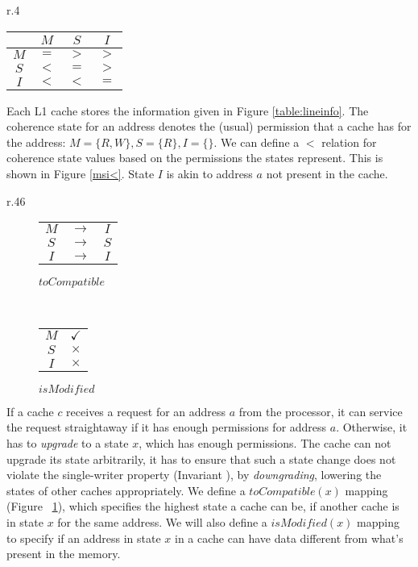 \begin{wrapfigure}{r}{.4\linewidth}
\centering
\begin{tabular}{|c|ccc|}
\hline
& $M$ & $S$ & $I$\\
\hline
$M$ & $=$ & $>$ & $>$\\
$S$ & $<$ & $=$ & $>$\\
$I$ & $<$ & $<$ & $=$\\
\hline
\end{tabular}
\caption{$<$ and other relations for MSI states}
\label{msi<}
\end{wrapfigure}

Each L1 cache stores the information given in Figure \ref{table:lineinfo}. The
coherence state for an address denotes the (usual) permission that a cache has
for the address: $M = \{R, W\}, S = \{R\}, I = \{\}$. We can define a $<$
relation for coherence state values based on the permissions the states
represent. This is shown in Figure \ref{msi<}. State $I$ is akin to address $a$
not present in the cache.

\begin{wrapfigure}{r}{.46\linewidth}
\begin{subfigure}{.27\linewidth}
\centering
\begin{tabular}{|ccc|}
\hline
$M$ & $\rightarrow$ & $I$\\
$S$ & $\rightarrow$ & $S$\\
$I$ & $\rightarrow$ & $I$\\
\hline
\end{tabular}
\caption{$toCompatible$}
\label{toCompat}
\end{subfigure}
~~~~~~~~~~~~~~
\begin{subfigure}{.21\linewidth}
\centering
\begin{tabular}{|c|c|}
\hline
$M$ & $\checkmark$\\
$S$ & $\times$\\
$I$ & $\times$\\
\hline
\end{tabular}
\caption{$isModified$}
\label{isModified}
\end{subfigure}
\caption{$toCompatible$ and $isModified$ mappings}
\label{fig:msimap}
\end{wrapfigure}

If a cache $c$ receives a request for an address $a$ from the processor, it can
service the request straightaway if it has enough permissions for address $a$.
Otherwise, it has to \emph{upgrade} to a state $x$, which has enough
permissions. The cache can not upgrade its state arbitrarily, it has to ensure
that such a state change does not violate the single-writer property (Invariant
\label{singleWriter}), by \emph{downgrading}, \ie lowering the states of other
caches appropriately. We define a $toCompatible(x)$ mapping (Figure
~\ref{toCompat}), which specifies the highest state a cache can be, if another
cache is in state $x$ for the same address. We will also define a
$isModified(x)$ mapping to specify if an address in state $x$ in a cache can
have data different from what's present in the memory.

